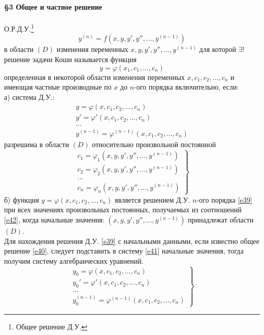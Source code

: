 \documentclass{article}
\numberwithin{equation}{section}
\begin{document}
\textbf{\large{\S3 Общее и частное решение}}
\\\\
О.Р.Д.У.\footnote{Общее решение Д.У.}
\begin{equation}\label{e39}
y^{(n)}=f(x,y,y',y'',...,y^{(n-1)})
\end{equation}
в области $(D)$ изменения переменных $x,y,y',y'',...,y^{(n-1)}$ для которой $\exists!$ решение задачи Коши называется функция
\begin{equation}\label{e40}
y=\varphi(x_1,c_1,...,c_n)
\end{equation}
определенная в некоторой области изменения переменных $x,c_1,c_2,...,c_n$ и имеющая частные производные по $x$ до $n$-ого порядка включительно, если:\\
а) система Д.У.:
\begin{equation}\label{e41}
\begin{array}{l}
y=\varphi(x,c_1,c_2,...,c_n)\\
y'=\varphi'(x,c_1,c_2,...,c_n)\\
...\\
y^{(n-1)}=\varphi^{(n-1)}(x,c_1,c_2,...,c_n)
\end{array}
\end{equation}
разрешима в области $(D)$ относительно произвольной постоянной
\begin{equation}\label{e42}
\left.
\begin{array}{l}
c_1=\varphi_1(x,y,y',y'',...,y^{(n-1)})\\
c_2=\varphi_2(x,y,y',y'',...,y^{(n-1)})\\
...\\
c_n=\varphi_n(x,y,y',y'',...,y^{(n-1)})
\end{array}
\right\}
\end{equation}
б) функция $y=\varphi(x,c_1,c_2,...,c_n)$ является решением Д.У. $n$-ого порядка \eqref{e39} при всех значениях произвольных постоянных, получаемых из соотношений \eqref{e42}, когда начальные значения: $(x,y,y',y'',...,y^{(n-1)})$ принадлежат области $(D)$.\\
Для нахождения решения Д.У. \eqref{e39} с начальными данными, если известно общее решение \eqref{e40}, следует подставить в систему \eqref{e41} начальные значения, тогда получим систему алгебраических уравнений.\\
\begin{equation}\label{e43}
\left.
\begin{array}{l}
y_0=\varphi(x,c_1,c_2,...,c_n)\\
y_0'=\varphi'(x,c_1,c_2,...,c_n)\\
...\\
y_0^{(n-1)}=\varphi^{(n-1)}(x,c_1,c_2,...,c_n)
\end{array}
\right\}
\end{equation}
\end{document}
